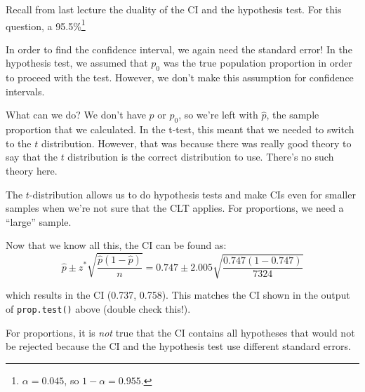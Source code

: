 \documentclass[
  letterpaper,
  DIV=11,
  numbers=noendperiod]{scrreprt}
\begin{document}
Recall from last lecture the duality of the CI and the hypothesis test.
For this question, a 95.5\%\footnote{\(\alpha = 0.045\), so
  \(1 - \alpha = 0.955\).}

In order to find the confidence interval, we again need the standard
error! In the hypothesis test, we assumed that \(p_0\) was the true
population proportion in order to proceed with the test. However, we
don't make this assumption for confidence intervals.

What can we do? We don't have \(p\) or \(p_0\), so we're left with
\(\hat p\), the sample proportion that we calculated. In the t-test,
this meant that we needed to switch to the \(t\) distribution. However,
that was because there was really good theory to say that the \(t\)
distribution is the correct distribution to use. There's no such theory
here.

\begin{tcolorbox}[enhanced jigsaw, toptitle=1mm, colbacktitle=quarto-callout-warning-color!10!white, breakable, leftrule=.75mm, left=2mm, opacityback=0, colframe=quarto-callout-warning-color-frame, rightrule=.15mm, toprule=.15mm, bottomtitle=1mm, titlerule=0mm, title=\textcolor{quarto-callout-warning-color}{\faExclamationTriangle}\hspace{0.5em}{CIs for Proportions Only Work When the CLT Applies}, arc=.35mm, colback=white, bottomrule=.15mm, opacitybacktitle=0.6, coltitle=black]

The \(t\)-distribution allows us to do hypothesis tests and make CIs
even for smaller samples when we're not sure that the CLT applies. For
proportions, we need a ``large'' sample.

\end{tcolorbox}

Now that we know all this, the CI can be found as: \[
\hat p \pm z^*\sqrt{\frac{\hat p(1-\hat p)}{n}} = 0.747 \pm 2.005\sqrt{\frac{0.747(1-0.747)}{7324}}
\]

which results in the CI (0.737, 0.758). This matches the CI shown in the
output of \texttt{prop.test()} above (double check this!).

\begin{tcolorbox}[enhanced jigsaw, toptitle=1mm, colbacktitle=quarto-callout-warning-color!10!white, breakable, leftrule=.75mm, left=2mm, opacityback=0, colframe=quarto-callout-warning-color-frame, rightrule=.15mm, toprule=.15mm, bottomtitle=1mm, titlerule=0mm, title=\textcolor{quarto-callout-warning-color}{\faExclamationTriangle}\hspace{0.5em}{Duality of Hypotheses and CIs}, arc=.35mm, colback=white, bottomrule=.15mm, opacitybacktitle=0.6, coltitle=black]

For proportions, it is \emph{not} true that the CI contains all
hypotheses that would not be rejected because the CI and the hypothesis
test use different standard errors.

\end{tcolorbox}
\end{document}
